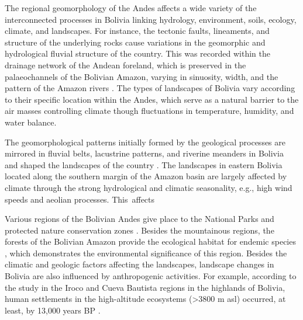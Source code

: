 \documentclass[data,article,accept,pdftex,moreauthors]{Definitions/mdpi}
\begin{document}
{The} regional geomorphology of {the} Andes affects a wide variety of {the} interconnected {processes} {in} Bolivia {linking} hydrology, environment, soils, ecology, climate, and landscapes. For instance, the tectonic faults, lineaments, and structure of the underlying rocks cause variations in the geomorphic and hydrological fluvial structure of {the country}. This was recorded within the drainage network of the Andean foreland, which is preserved in the {palaeochannels} of the Bolivian Amazon, {varying} in sinuosity, width, and the pattern of the Amazon rivers \cite{Plotzki}. {The types of} landscapes of Bolivia vary according to their {specific} location within {the} Andes, which serve as a natural barrier to the air masses controlling climate {though} fluctuations in temperature{, }humidity, and water balance{.} 

The geomorphological patterns initially formed by the {geological} processes are mirrored in fluvial belts, lacustrine patterns, and riverine meanders {in} Bolivia and {shaped the} landscapes of the country \cite{Dumont}. {The} landscapes in eastern Bolivia located along the southern margin of the Amazon basin are {largely} affected by climate {through the} strong hydrological and climatic seasonality, e.g.{, }high wind speeds and aeolian processes. \mbox{This affects}  

Various regions of the Bolivian Andes give place to the National Parks and protected nature conservation zones \cite{Baumannetal2018,Thomasetal,Burbridge}. Besides {the} mountainous regions, the forests of the Bolivian Amazon provide {the} ecological habitat for {}endemic species \cite{Cadima}, which demonstrates the environmental significance of this region. Besides {the climatic and geologic} factors affecting the landscapes, {landscape} changes in Bolivia {are also influenced by } anthropogenic activities. {For example,} according to the study in the Iroco and Cueva Bautista regions in the highlands of Bolivia, human settlements in the high-altitude ecosystems (>3800 m asl) occurred, at least, by 13,000 years BP \cite{Capriles}. 
\end{document}

